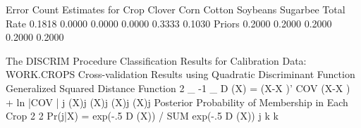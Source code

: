 \documentclass{article}
\begin{document}
\begin{Woutput}
                           Error Count Estimates for Crop
                  Clover        Corn      Cotton    Soybeans    Sugarbee       Total
Rate              0.1818      0.0000      0.0000      0.0000      0.3333      0.1030
Priors            0.2000      0.2000      0.2000      0.2000      0.2000

The DISCRIM Procedure
Classification Results for Calibration Data: WORK.CROPS
Cross-validation Results using Quadratic Discriminant Function
Generalized Squared Distance Function
 2         _          -1     _
D (X) = (X-X    )' COV    (X-X    ) + ln |COV    |
 j          (X)j      (X)j    (X)j           (X)j
Posterior Probability of Membership in Each Crop
                   2                    2
Pr(j|X) = exp(-.5 D (X)) / SUM exp(-.5 D (X))
                   j        k           k


\end{Woutput}
\end{document}
